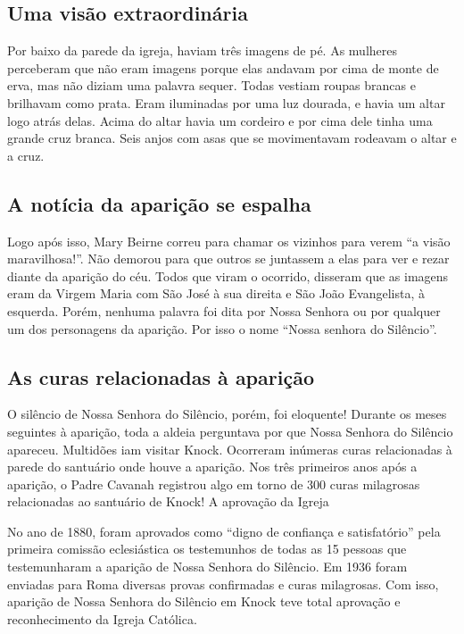 \documentclass[a4paper,14pt]{extarticle} \usepackage[utf8]{inputenc}
\begin{document}
\subsection{Uma visão extraordinária}

Por baixo da parede da igreja, haviam três imagens de pé. As mulheres perceberam que não eram imagens porque elas andavam por cima de monte de erva, mas não diziam uma palavra sequer. Todas vestiam roupas brancas e brilhavam como prata. Eram iluminadas por uma luz dourada, e havia um altar logo atrás delas. Acima do altar havia um cordeiro e por cima dele tinha uma grande cruz branca. Seis anjos com asas que se movimentavam rodeavam o altar e a cruz.

\subsection{A notícia da aparição se espalha}

Logo após isso, Mary Beirne correu para chamar os vizinhos para verem “a visão maravilhosa!”. Não demorou para que outros se juntassem a elas para ver e rezar diante da aparição do céu. Todos que viram o ocorrido, disseram que as imagens eram da Virgem Maria com São José à sua direita e São João Evangelista, à esquerda. Porém, nenhuma palavra foi dita por Nossa Senhora ou por qualquer um dos personagens da aparição. Por isso o nome “Nossa senhora do Silêncio”.

\subsection{As curas relacionadas à aparição}

O silêncio de Nossa Senhora do Silêncio, porém, foi eloquente! Durante os meses seguintes à aparição, toda a aldeia perguntava por que Nossa Senhora do Silêncio apareceu. Multidões iam visitar Knock. Ocorreram inúmeras curas relacionadas à parede do santuário onde houve a aparição. Nos três primeiros anos após a aparição, o Padre Cavanah registrou algo em torno de 300 curas milagrosas relacionadas ao santuário de Knock!
A aprovação da Igreja

No ano de 1880, foram aprovados como “digno de confiança e satisfatório” pela primeira comissão eclesiástica os testemunhos de todas as 15 pessoas que testemunharam a aparição de Nossa Senhora do Silêncio. Em 1936 foram enviadas para Roma diversas provas confirmadas e curas milagrosas. Com isso, aparição de Nossa Senhora do Silêncio em Knock teve total aprovação e reconhecimento da Igreja Católica.
\end{document}
